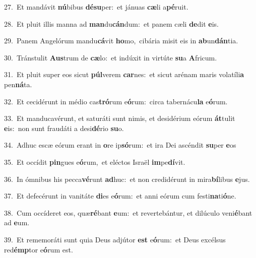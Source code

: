 {\numbfont\textcolor{\numbcolor}{27.}}~Et mandávit \textbf{nú}\-bibus \textbf{dé}\-\textbf{su}per:~\star et jánuas \textbf{cæ}\-li a\-\textbf{pé}\-ruit.\par
{\numbfont\textcolor{\numbcolor}{28.}}~Et pluit illis manna ad \textbf{man}\-du\-\textbf{cán}\-dum:~\star et panem cæli \textbf{de}\-dit \textbf{e}\-is.\par
{\numbfont\textcolor{\numbcolor}{29.}}~Panem Angelórum mandu\-\textbf{cá}\-vit \textbf{ho}\-mo,~\star cibária misit eis in \textbf{ab}\-un\-\textbf{dán}\-tia.\par
{\numbfont\textcolor{\numbcolor}{30.}}~Tránstulit \textbf{Aus}\-trum de \textbf{cæ}\-lo:~\star et indúxit in virtúte \textbf{su}\-a \textbf{A}\-fricum.\par
{\numbfont\textcolor{\numbcolor}{31.}}~Et pluit super eos sicut \textbf{púl}\-verem \textbf{car}\-nes:~\star et sicut arénam maris volatíli\textbf{a} pen\-\textbf{ná}\-ta.\par
{\numbfont\textcolor{\numbcolor}{32.}}~Et cecidérunt in médio cas\-\textbf{tró}\-rum e\-\textbf{ó}\-rum:~\star circa tabernácu\textbf{la} e\-\textbf{ó}\-rum.\par
{\numbfont\textcolor{\numbcolor}{33.}}~Et manducavérunt, et saturáti sunt nimis, et desidérium eórum \textbf{át}\-tulit \textbf{e}\-is:~\star non sunt fraudáti a desi\-\textbf{dé}\-rio \textbf{su}\-o.\par
{\numbfont\textcolor{\numbcolor}{34.}}~Adhuc escæ eórum erant in \textbf{o}\-re ip\-\textbf{só}\-rum:~\star et ira Dei ascéndit \textbf{su}\-per \textbf{e}\-os\par
{\numbfont\textcolor{\numbcolor}{35.}}~Et occídit \textbf{pin}\-gues e\-\textbf{ó}\-rum,~\star et eléctos Israël \textbf{im}\-pe\-\textbf{dí}\-vit.\par
{\numbfont\textcolor{\numbcolor}{36.}}~In ómnibus his pecca\-\textbf{vé}\-runt \textbf{ad}\-huc:~\star et non credidérunt in mira\-\textbf{bí}\-libus \textbf{e}\-jus.\par
{\numbfont\textcolor{\numbcolor}{37.}}~Et defecérunt in vanitáte \textbf{di}\-es e\-\textbf{ó}\-rum:~\star et anni eórum cum festi\-\textbf{na}\-ti\-\textbf{ó}\-ne.\par
{\numbfont\textcolor{\numbcolor}{38.}}~Cum occíderet eos, quæ\-\textbf{ré}\-bant \textbf{e}\-um:~\star et revertebántur, et dilúculo veni\-\textbf{é}\-bant ad \textbf{e}\-um.\par
{\numbfont\textcolor{\numbcolor}{39.}}~Et rememoráti sunt quia Deus adjútor \textbf{est} e\-\textbf{ó}\-rum:~\star et Deus excélsus red\-\textbf{émp}\-tor e\-\textbf{ó}\-rum est.\par
